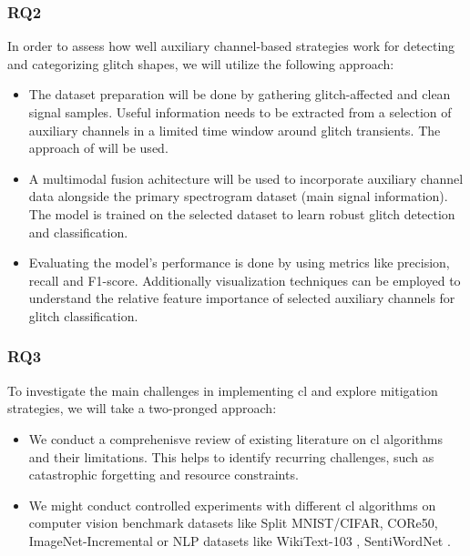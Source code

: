 \subsubsection{RQ2}
In order to assess how well auxiliary channel-based strategies work for detecting and categorizing glitch shapes, we will utilize the following approach:
\begin{itemize}
    \item The dataset preparation will be done by gathering glitch-affected and clean signal samples. Useful information needs to be extracted from a selection of auxiliary channels in a limited time window around glitch transients. The approach of \citep{colgan2020efficient} will be used. 
    \item A multimodal fusion achitecture will be used to incorporate auxiliary channel data alongside the primary spectrogram dataset (main signal information). The model is trained on the selected dataset to learn robust glitch detection and classification. 
    \item Evaluating the model's performance is done by using metrics like precision, recall and F1-score. Additionally visualization techniques can be employed to understand the relative feature importance of selected auxiliary channels for glitch classification. 
\end{itemize}
\subsubsection{RQ3}
To investigate the main challenges in implementing \acrfull{cl} and explore mitigation strategies, we will take a two-pronged approach: 
\begin{itemize}
    \item We conduct a comprehenisve review of existing literature on \acrshort{cl} algorithms and their limitations. This helps to identify recurring challenges, such as catastrophic forgetting and resource constraints. 
    \item We might conduct controlled experiments with different \acrshort{cl} algorithms on computer vision benchmark datasets like Split MNIST/CIFAR, CORe50, ImageNet-Incremental \citep{wu2019large} or NLP datasets like WikiText-103 \citep{wang2021wikigraphs}, SentiWordNet \citep{das2010sentiwordnet}.
\end{itemize}